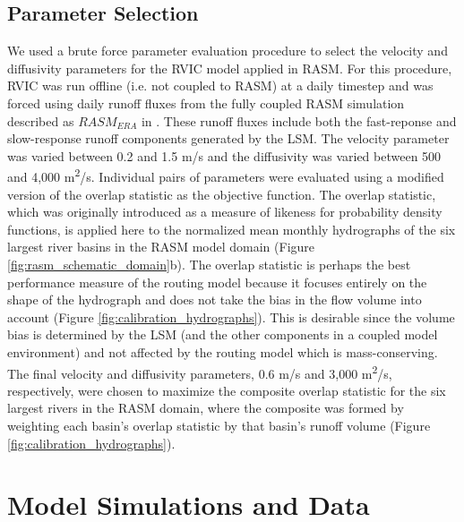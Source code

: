 \documentclass[jgrga, draft]{agutex}
\begin{document}
\begin{article}
\subsection{Parameter Selection}
\label{sec:parameters}

We used a brute force parameter evaluation procedure to select the velocity and diffusivity parameters for the RVIC model applied in RASM.
For this procedure, RVIC was run offline (i.e. not coupled to RASM) at a daily timestep and was forced using daily runoff fluxes from the fully coupled RASM simulation described as $RASM_{ERA}$ in \citet{Hamman_2016}.
These runoff fluxes include both the fast-reponse and slow-response runoff components generated by the LSM.
The velocity parameter was varied between 0.2 and 1.5 m/s and the diffusivity was varied between 500 and 4,000 m\textsuperscript{2}/s. %
Individual pairs of parameters were evaluated using a modified version of the overlap statistic \citep{Perkins_2012} as the objective function. %
The overlap statistic, which was originally introduced as a measure of likeness for probability density functions, is applied here to the normalized mean monthly hydrographs of the six largest river basins in the RASM model domain (Figure \ref{fig:rasm_schematic_domain}b).
The overlap statistic is perhaps the best performance measure of the routing model because it focuses entirely on the shape of the hydrograph and does not take the bias in the flow volume into account (Figure \ref{fig:calibration_hydrographs}). This is desirable since the volume bias is determined by the LSM (and the other components in a coupled model environment) and not affected by the routing model which is mass-conserving.
The final velocity and diffusivity parameters, 0.6 m/s and 3,000 m\textsuperscript{2}/s, respectively, were chosen to maximize the composite overlap statistic for the six largest rivers in the RASM domain, where the composite was formed by weighting each basin's overlap statistic by that basin's runoff volume (Figure \ref{fig:calibration_hydrographs}).

\section{Model Simulations and Data}
\label{sec:data}


\end{article}
\end{document}
